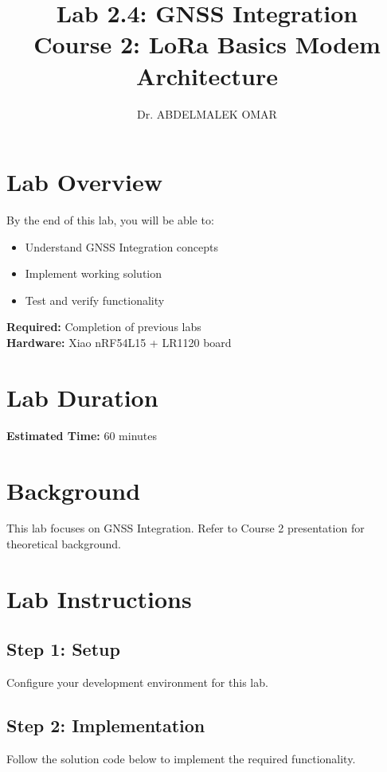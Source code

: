 \documentclass[11pt,a4paper]{article}
\title{\textbf{Lab 2.4: GNSS Integration}\\
\large Course 2: LoRa Basics Modem Architecture}
\author{Dr. ABDELMALEK OMAR}
\date{}
\begin{document}
\maketitle
\thispagestyle{fancy}

\section{Lab Overview}

\begin{objectivebox}
By the end of this lab, you will be able to:
\begin{itemize}
    \item Understand GNSS Integration concepts
    \item Implement working solution
    \item Test and verify functionality
\end{itemize}
\end{objectivebox}

\begin{prereqbox}
\textbf{Required:} Completion of previous labs\\
\textbf{Hardware:} Xiao nRF54L15 + LR1120 board
\end{prereqbox}

\section{Lab Duration}
\textbf{Estimated Time:} 60 minutes

\section{Background}

This lab focuses on GNSS Integration. Refer to Course 2 presentation for theoretical background.

\section{Lab Instructions}

\subsection{Step 1: Setup}
Configure your development environment for this lab.

\subsection{Step 2: Implementation}
Follow the solution code below to implement the required functionality.
\end{document}
